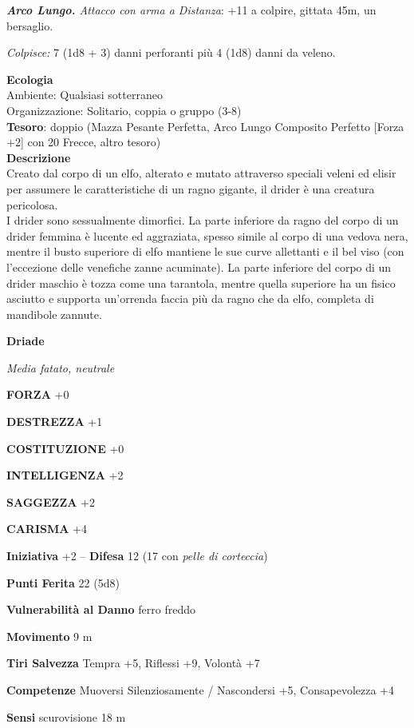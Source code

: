 \begin{multicols}{2}
\textit{\textbf{Arco Lungo.} Attacco con arma a Distanza}: +11 a colpire, gittata 45m, un bersaglio.

\textit{Colpisce:} 7 (1d8 + 3) danni perforanti più 4 (1d8) danni da veleno.

\textbf{Ecologia}\\
Ambiente: Qualsiasi sotterraneo\\
Organizzazione: Solitario, coppia o gruppo (3-8)\\
\textbf{Tesoro}: doppio (Mazza Pesante Perfetta, Arco Lungo Composito Perfetto [Forza +2] con 20 Frecce, altro tesoro)\\
\textbf{Descrizione}\\
Creato dal corpo di un elfo, alterato e mutato attraverso speciali veleni ed elisir per assumere le caratteristiche di un ragno gigante, il drider è una creatura pericolosa.\\
I drider sono sessualmente dimorfici. La parte inferiore da ragno del corpo di un drider femmina è lucente ed aggraziata, spesso simile al corpo di una vedova nera, mentre il busto superiore di elfo mantiene le sue curve allettanti e il bel viso (con l'eccezione delle venefiche zanne acuminate). La parte inferiore del corpo di un drider maschio è tozza come una tarantola, mentre quella superiore ha un fisico asciutto e supporta un'orrenda faccia più da ragno che da elfo, completa di mandibole zannute.


\medskip{}\textbf{Driade}

\textit{Media fatato, neutrale}

\textbf{FORZA} +0

\textbf{DESTREZZA} +1

\textbf{COSTITUZIONE} +0

\textbf{INTELLIGENZA} +2

\textbf{SAGGEZZA} +2

\textbf{CARISMA} +4

\textbf{Iniziativa} +2 -- \textbf{Difesa} 12 (17 con \textit{pelle di corteccia})

\textbf{Punti Ferita} 22 (5d8)

\textbf{Vulnerabilità al Danno} ferro freddo

\textbf{Movimento} 9 m

\textbf{Tiri Salvezza} Tempra +5, Riflessi +9, Volontà +7

\textbf{Competenze} Muoversi Silenziosamente / Nascondersi +5, Consapevolezza +4

\textbf{Sensi} scurovisione 18 m


\end{multicols}

